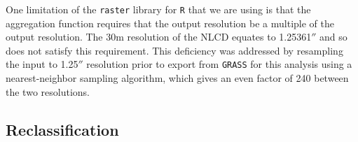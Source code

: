 One limitation of the \texttt{raster} library for \texttt{R} that we
are using is that the aggregation function requires that the output
resolution be a multiple of the output resolution.  The 30m resolution
of the NLCD equates to 1.25361$''$ and so does not satisfy this
requirement.  This deficiency was addressed by resampling the input to
1.25$''$ resolution prior to export from \texttt{GRASS} for this
analysis using a nearest-neighbor sampling algorithm, which gives an
even factor of 240 between the two resolutions.



\subsection{Reclassification}
\label{sec:nlcd-reclass}



